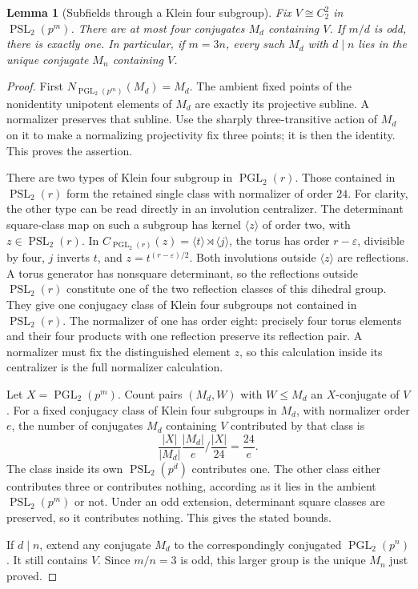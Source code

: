 \documentclass[11pt,a4paper]{article}
\newtheorem{lemma}{Lemma}
\newcommand{\PSL}{\operatorname{PSL}}
\newcommand{\PGL}{\operatorname{PGL}}
\newcommand{\gen}[1]{\langle#1\rangle}
\begin{document}
\begin{lemma}[Subfields through a Klein four subgroup]\label{four}
Fix $V\cong C_2^2$ in $\PSL_2(p^m)$. There are at most four
conjugates $M_d$ containing $V$. If $m/d$ is odd, there is exactly
one. In particular, if $m=3n$, every such $M_d$ with $d\mid n$
lies in the unique conjugate $M_n$ containing $V$.
\end{lemma}
\begin{proof}
First $N_{\PGL_2(p^m)}(M_d)=M_d$. The ambient fixed points of
the nonidentity unipotent elements of $M_d$ are exactly its projective
subline. A normalizer preserves that subline. Use the sharply
three-transitive action of $M_d$ on it to make a normalizing projectivity
fix three points; it is then the identity. This proves the assertion.

There are two types of Klein four subgroup in $\PGL_2(r)$.
Those contained in $\PSL_2(r)$ form the retained single class with
normalizer of order $24$. For clarity, the other type can be read
directly in an involution centralizer. The determinant square-class
map on such a subgroup has kernel $\gen z$ of order two, with
$z\in\PSL_2(r)$. In $C_{\PGL_2(r)}(z)=\gen t\rtimes\gen j$,
the torus has order $r-\varepsilon$, divisible by four, $j$ inverts
$t$, and $z=t^{(r-\varepsilon)/2}$. Both involutions outside
$\gen z$ are reflections. A torus generator has nonsquare determinant,
so the reflections outside $\PSL_2(r)$ constitute one of the two
reflection classes of this dihedral group. They give one conjugacy
class of Klein four subgroups not contained in $\PSL_2(r)$.
The normalizer of one has order eight: precisely four torus elements
and their four products with one reflection preserve its reflection
pair. A normalizer must fix the distinguished element $z$, so this
calculation inside its centralizer is the full normalizer calculation.

Let $X=\PGL_2(p^m)$. Count pairs $(M_d,W)$ with $W\leq M_d$
an $X$-conjugate of $V$. For a fixed conjugacy class of Klein four
subgroups in $M_d$, with normalizer order $e$, the number of
conjugates $M_d$ containing $V$ contributed by that class is
\[
 \frac{|X|}{|M_d|}\frac{|M_d|}{e}
 \bigg/\frac{|X|}{24}=\frac{24}{e}.
\]
The class inside its own $\PSL_2(p^d)$ contributes one. The other
class either contributes three or contributes nothing, according as
it lies in the ambient $\PSL_2(p^m)$ or not. Under an odd extension,
determinant square classes are preserved, so it contributes nothing.
This gives the stated bounds.

If $d\mid n$, extend any conjugate $M_d$ to the correspondingly
conjugated $\PGL_2(p^n)$. It still contains $V$. Since $m/n=3$
is odd, this larger group is the unique $M_n$ just proved.
\end{proof}
\end{document}
